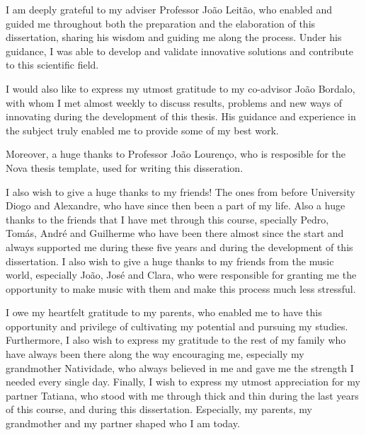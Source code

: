 
%

\begin{ntacknowledgements}

I am deeply grateful to my adviser Professor João Leitão, who enabled and guided me throughout both the preparation and the elaboration of this dissertation, sharing his wisdom and guiding me along the process. Under his guidance, I was able to develop and validate innovative solutions and contribute to this scientific field.

I would also like to express my utmost gratitude to my co-advisor João Bordalo, with whom I met almost weekly to discuss results, problems and new ways of innovating during the development of this thesis. His guidance and experience in the subject truly enabled me to provide some of my best work.

Moreover, a huge thanks to Professor João Lourenço, who is resposible for the Nova thesis template, used for writing this disseration.

I also wish to give a huge thanks to my friends! The ones from before University Diogo and Alexandre, who have since then been a part of my life. Also a huge thanks to the friends that I have met through this course, specially Pedro, Tomás, André and Guilherme who have been there almost since the start and always supported me during these five years and during the development of this dissertation. I also wish to give a huge thanks to my friends from the music world, especially João, José and Clara, who were responsible for granting me the opportunity to make music with them and make this process much less stressful.

I owe my heartfelt gratitude to my parents, who enabled me to have this opportunity and privilege of cultivating my potential and pursuing my studies. Furthermore, I also wish to express my gratitude to the rest of my family who have always been there along the way encouraging me, especially my grandmother Natividade, who always believed in me and gave me the strength I needed every single day. Finally, I wish to express my utmost appreciation for my partner Tatiana, who stood with me through thick and thin during the last years of this course, and during this dissertation. Especially, my parents, my grandmother and my partner shaped who I am today.

\end{ntacknowledgements}
